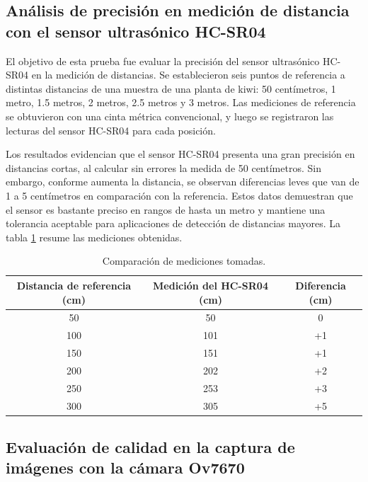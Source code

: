\subsection{Análisis de precisión en medición de distancia con el sensor ultrasónico HC-SR04}

El objetivo de esta prueba fue evaluar la precisión del sensor ultrasónico HC-SR04 en la medición de distancias. Se establecieron seis puntos de referencia a distintas distancias de una muestra de una planta de kiwi: 50 centímetros, 1 metro, 1.5 metros, 2 metros, 2.5 metros y 3 metros. Las mediciones de referencia se obtuvieron con una cinta métrica convencional, y luego se registraron las lecturas del sensor HC-SR04 para cada posición.

Los resultados evidencian que el sensor HC-SR04 presenta una gran precisión en distancias cortas, al calcular sin errores la medida de 50 centímetros. Sin embargo, conforme aumenta la distancia, se observan diferencias leves que van de 1 a 5 centímetros en comparación con la referencia. Estos datos demuestran que el sensor es bastante preciso en rangos de hasta un metro y mantiene una tolerancia aceptable para aplicaciones de detección de distancias mayores. La tabla \ref{tab:HCSR04_comparacion} resume las mediciones obtenidas.

\begin{table}[h]
	\centering
	\caption[Comparación de mediciones tomadas]{Comparación de mediciones tomadas.}
	\begin{tabular}{c c c}    
		\toprule
		\textbf{Distancia de referencia (cm)} 	 & \textbf{Medición del HC-SR04 (cm)} 		& \textbf{Diferencia (cm)}  \\
		\midrule
		50 & 50 & 0 \\		
		100 & 101 & +1 \\	
		150 & 151 & +1 \\	
            200 & 202 & +2 \\	
            250 & 253 & +3 \\	
            300 & 305 & +5 \\	
		\bottomrule
		\hline
	\end{tabular}
	\label{tab:HCSR04_comparacion}
\end{table}

\newpage

\subsection{Evaluación de calidad en la captura de imágenes con la cámara Ov7670}

